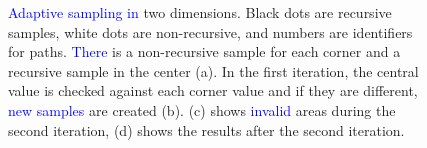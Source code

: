 \documentclass{egpubl}
\newcommand{\diff}[1]{\textcolor{blue}{#1}}
\begin{document}
\begin{figure}[ht]
{		\label{fig:sampling:adaptive:3}
	}
	\hfill
	\hfill
	\caption{\diff{Adaptive} \diff{sampling in} two dimensions. Black dots are recursive samples, white dots are non-recursive, and numbers are identifiers for paths. \diff{There} is a non-recursive sample for each corner and a recursive sample in the center (a). In the first iteration, the central value is checked against each corner value and if they are different, \diff{new samples} are created (b). (c) shows \diff{invalid} areas during the second iteration, (d) shows the results after the second iteration.}
	\label{fig:sampling:adaptive}
\end{figure}
\end{document}
